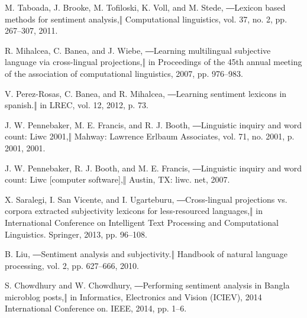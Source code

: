 \documentclass[conference]{IEEEtran}
\begin{document}
\begin{thebibliography}{00}
 M. Taboada, J. Brooke, M. Tofiloski, K. Voll, and M. Stede, ―Lexicon based methods for sentiment analysis,‖ Computational linguistics, vol. 37, no. 2, pp. 267–307, 2011.

R. Mihalcea, C. Banea, and J. Wiebe, ―Learning multilingual subjective language via cross-lingual projections,‖ in Proceedings of the 45th annual meeting of the association of computational linguistics, 2007, pp. 976–983.

 V. Perez-Rosas, C. Banea, and R. Mihalcea, ―Learning sentiment lexicons in spanish.‖ in LREC, vol. 12, 2012, p. 73.

 J. W. Pennebaker, M. E. Francis, and R. J. Booth, ―Linguistic inquiry and word count: Liwc 2001,‖ Mahway: Lawrence Erlbaum Associates, vol. 71, no. 2001, p. 2001, 2001.

 J. W. Pennebaker, R. J. Booth, and M. E. Francis, ―Linguistic inquiry and word count: Liwc [computer software],‖ Austin, TX: liwc. net, 2007.

 X. Saralegi, I. San Vicente, and I. Ugarteburu, ―Cross-lingual projections vs. corpora extracted subjectivity lexicons for less-resourced languages,‖ in International Conference on Intelligent Text Processing and Computational Linguistics. Springer, 2013, pp. 96–108.

 B. Liu, ―Sentiment analysis and subjectivity.‖ Handbook of natural language processing, vol. 2, pp. 627–666, 2010.

 S. Chowdhury and W. Chowdhury, ―Performing sentiment analysis in Bangla microblog posts,‖ in Informatics, Electronics and Vision (ICIEV), 2014 International Conference on. IEEE, 2014, pp. 1–6.

\end{thebibliography}
\vspace{12pt}
\end{document}
